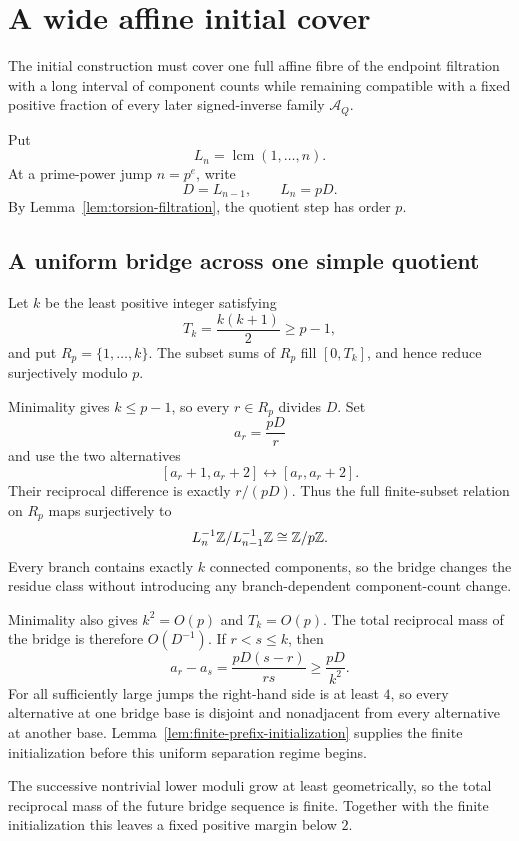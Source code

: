 \section{A wide affine initial cover}
\label{sec:wide-start}

The initial construction must cover one full affine fibre of the endpoint filtration with a long interval of component counts while remaining compatible with a fixed positive fraction of every later signed-inverse family $\mathcal A_Q$.

Put
\[
L_n=\operatorname{lcm}(1,\ldots,n).
\]
At a prime-power jump $n=p^e$, write
\[
D=L_{n-1},
\qquad
L_n=pD.
\]
By Lemma~\ref{lem:torsion-filtration}, the quotient step has order $p$.

\subsection{A uniform bridge across one simple quotient}

Let $k$ be the least positive integer satisfying
\[
T_k=\frac{k(k+1)}2\ge p-1,
\]
and put $R_p=\{1,\ldots,k\}$.  The subset sums of $R_p$ fill $[0,T_k]$, and hence reduce surjectively modulo $p$.

Minimality gives $k\le p-1$, so every $r\in R_p$ divides $D$.  Set
\[
a_r=\frac{pD}{r}
\]
and use the two alternatives
\begin{equation}\label{eq:bridge-switch}
[a_r+1,a_r+2]
\longleftrightarrow
[a_r,a_r+2].
\end{equation}
Their reciprocal difference is exactly $r/(pD)$.  Thus the full finite-subset relation on $R_p$ maps surjectively to
\[
L_n^{-1}\mathbb Z/L_{n-1}^{-1}\mathbb Z
\cong\mathbb Z/p\mathbb Z.
\]
Every branch contains exactly $k$ connected components, so the bridge changes the residue class without introducing any branch-dependent component-count change.

Minimality also gives $k^2=O(p)$ and $T_k=O(p)$.  The total reciprocal mass of the bridge is therefore $O(D^{-1})$.  If $r<s\le k$, then
\begin{equation}\label{eq:bridge-separation}
a_r-a_s
=\frac{pD(s-r)}{rs}
\ge\frac{pD}{k^2}.
\end{equation}
For all sufficiently large jumps the right-hand side is at least $4$, so every alternative at one bridge base is disjoint and nonadjacent from every alternative at another base.  Lemma~\ref{lem:finite-prefix-initialization} supplies the finite initialization before this uniform separation regime begins.

The successive nontrivial lower moduli grow at least geometrically, so the total reciprocal mass of the future bridge sequence is finite.  Together with the finite initialization this leaves a fixed positive margin below $2$.

